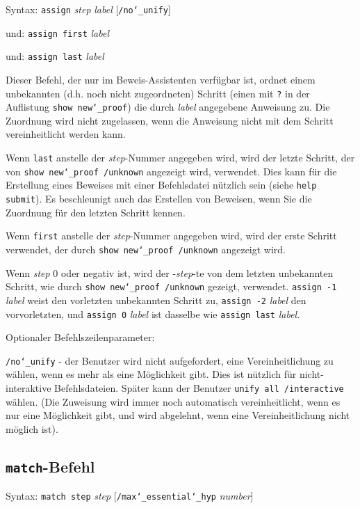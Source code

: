 Syntax:   \texttt{assign} {\em step} {\em label} [\texttt{/no{\char`\_}unify}]

   und:   \texttt{assign first} {\em label}

   und:   \texttt{assign last} {\em label}

Dieser Befehl, der nur im Beweis-Assistenten verfügbar ist, ordnet einem unbekannten (d.h. noch nicht zugeordneten) Schritt (einen mit \texttt{?} in der Auflistung \texttt{show new{\char`\_}proof}) die durch {\em label} angegebene Anweisung zu.  Die Zuordnung wird nicht zugelassen, wenn die Anweisung nicht mit dem Schritt vereinheitlicht werden kann. 

Wenn \texttt{last} anstelle der {\em step}-Nummer angegeben wird, wird der letzte Schritt, der von \texttt{show new{\char`\_}proof /unknown} angezeigt wird, verwendet.  Dies kann für die Erstellung eines Beweises mit einer Befehlsdatei nützlich sein (siehe \texttt{help submit}).  Es beschleunigt auch das Erstellen von Beweisen, wenn Sie die Zuordnung für den letzten Schritt kennen. 

Wenn \texttt{first} anstelle der {\em step}-Nummer angegeben wird, wird der erste Schritt verwendet, der durch \texttt{show new{\char`\_}proof /unknown} angezeigt wird. 

Wenn {\em step} 0 oder negativ ist, wird der -{\em step}-te von dem letzten unbekannten Schritt, wie durch \texttt{show new{\char`\_}proof /unknown} gezeigt, verwendet.  \texttt{assign -1} {\em label} weist den vorletzten unbekannten Schritt zu, \texttt{assign -2} {\em label} den vorvorletzten, und \texttt{assign 0} {\em label} ist dasselbe wie \texttt{assign last} {\em label}. 

Optionaler Befehlszeilenparameter:

    \texttt{/no{\char`\_}unify} - der Benutzer wird nicht aufgefordert, eine Vereinheitlichung zu wählen, wenn es mehr als eine Möglichkeit gibt.  Dies ist nützlich für nicht-interaktive Befehlsdateien.  Später kann der Benutzer \texttt{unify all /interactive} wählen. (Die Zuweisung wird immer noch automatisch vereinheitlicht, wenn es nur eine Möglichkeit gibt, und wird abgelehnt, wenn eine Vereinheitlichung nicht möglich ist).


\subsection{\texttt{match}-Befehl}

Syntax:  \texttt{match step} {\em step} [\texttt{/max{\char`\_}essential{\char`\_}hyp}
{\em number}]

